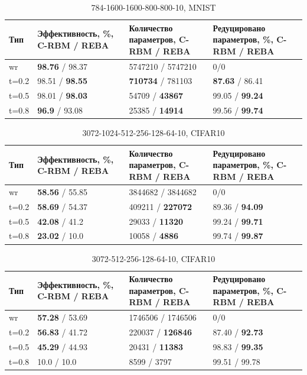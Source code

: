 \begin{table} [!h]
  \small
  \caption{784-1600-1600-800-800-10,  MNIST}\label{table:mnist_2}
\centering
\begin{tabular}{| p{2cm} | p{4cm} | p{4cm} | p{4cm} |}
  \hline
    \textbf{Тип} & \textbf{Эффективность, \%, C-RBM / REBA} & \textbf{Количество параметров, C-RBM / REBA} & \textbf{Редуцировано параметров, \%, C-RBM / REBA}\\
    \hline
    wr & \textbf{98.76} / 98.37 & 5747210 / 5747210 & 0/0\\
    \hline
    t=0.2 & 98.51 / \textbf{98.55} & \textbf{710734} / 781103 & \textbf{87.63} / 86.41\\
    \hline
    t=0.5 & 98.01 / \textbf{98.03} & 54709 / \textbf{43867} & 99.05 / \textbf{99.24}\\
    \hline
    t=0.8 & \textbf{96.9} / 93.08 & 25385 / \textbf{14914} & 99.56 / \textbf{99.74}\\
    \hline
\end{tabular}
\end{table}

\begin{table} [!h]
  \small
  \caption{3072-1024-512-256-128-64-10, CIFAR10}\label{table:cifar_10_1}
\centering
\begin{tabular}{| p{2cm} | p{4cm} | p{4cm} | p{4cm} |}
  \hline
    \textbf{Тип} & \textbf{Эффективность, \%, C-RBM / REBA} & \textbf{Количество параметров, C-RBM / REBA} & \textbf{Редуцировано параметров, \%, C-RBM / REBA}\\
    \hline
    wr & \textbf{58.56} / 55.85 & 3844682 / 3844682 & 0/0\\
    \hline
    t=0.2 & \textbf{58.69} / 54.37 & 409211 / \textbf{227072} & 89.36 / \textbf{94.09}\\
    \hline
    t=0.5 & \textbf{42.08} / 41.2 & 29033 / \textbf{11320} & 99.24 / \textbf{99.71}\\
    \hline
    t=0.8 & \textbf{23.02} / 10.0 & 10058 / \textbf{4886} & 99.74 / \textbf{99.87}\\
    \hline
\end{tabular}
\end{table}

\begin{table} [!h]
  \small
  \caption{3072-512-256-128-64-10, CIFAR10 }\label{table:cifar_10_2}
\centering
\begin{tabular}{| p{2cm} | p{4cm} | p{4cm} | p{4cm} |}
  \hline
    \textbf{Тип} & \textbf{Эффективность, \%, C-RBM / REBA} & \textbf{Количество параметров, C-RBM / REBA} & \textbf{Редуцировано параметров, \%, C-RBM / REBA}\\
    \hline
    wr & \textbf{57.28} / 53.69 & 1746506 / 1746506 & 0/0\\
    \hline
    t=0.2 & \textbf{56.83} / 41.72 & 220037 / \textbf{126846} & 87.40 / \textbf{92.73}\\
    \hline
    t=0.5 & \textbf{45.29} / 44.93 & 20431 / \textbf{11383} & 98.83 / \textbf{99.35}\\
    \hline
    t=0.8 & 10.0 / 10.0 & 8599 / 3797 & 99.51 / 99.78\\
    \hline
\end{tabular}
\end{table}

